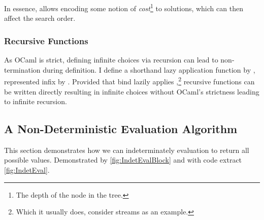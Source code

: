 In essence,  allows encoding some notion of \textit{cost}\footnote{The depth of the node in the tree.} to solutions, which can then affect the search order.

\subsubsection{Recursive Functions}
As OCaml is strict, defining infinite choices via recursion can lead to non-termination during definition. I define a shorthand lazy application function  by , represented infix by \code{|>-}. Provided that bind lazily applies ,\footnote{Which it usually does, consider streams as an example.} recursive functions can be written directly resulting in infinite choices without OCaml's strictness leading to infinite recursion.

\subsection{A Non-Deterministic Evaluation Algorithm}
\label{sec:IndetEvalAlgorithm}
This section demonstrates how we can indeterminately evaluation to return all possible values. Demonstrated by \cref{fig:IndetEvalBlock} and with code extract \cref{fig:IndetEval}.

